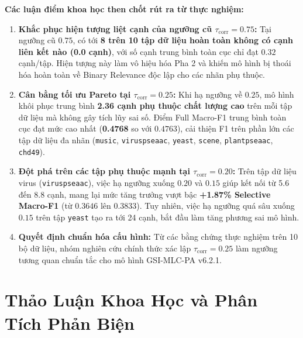 \documentclass[10pt,a4paper,twoside]{article}
\begin{document}
\noindent\textbf{Các luận điểm khoa học then chốt rút ra từ thực nghiệm:}
\begin{enumerate}[leftmargin=*]
    \item \textbf{Khắc phục hiện tượng liệt cạnh của ngưỡng cũ $\tau_{\text{corr}} = 0.75$:} 
    Tại ngưỡng cũ $0.75$, có tới \textbf{8 trên 10 tập dữ liệu hoàn toàn không có cạnh liên kết nào (0.0 cạnh)}, với số cạnh trung bình toàn cục chỉ đạt $0.32$ cạnh/tập. Hiện tượng này làm vô hiệu hóa Pha 2 và khiến mô hình bị thoái hóa hoàn toàn về Binary Relevance độc lập cho các nhãn phụ thuộc.
    \item \textbf{Cân bằng tối ưu Pareto tại $\tau_{\text{corr}} = 0.25$:} 
    Khi hạ ngưỡng về $0.25$, mô hình khôi phục trung bình \textbf{2.36 cạnh phụ thuộc chất lượng cao} trên mỗi tập dữ liệu mà không gây tích lũy sai số. Điểm Full Macro-F1 trung bình toàn cục đạt mức cao nhất (\textbf{0.4768} so với $0.4763$), cải thiện F1 trên phần lớn các tập dữ liệu đa nhãn (\texttt{music}, \texttt{viruspseaac}, \texttt{yeast}, \texttt{scene}, \texttt{plantpseaac}, \texttt{chd49}).
    \item \textbf{Đột phá trên các tập phụ thuộc mạnh tại $\tau_{\text{corr}} = 0.20$:} 
    Trên tập dữ liệu virus (\texttt{viruspseaac}), việc hạ ngưỡng xuống $0.20$ và $0.15$ giúp kết nối từ 5.6 đến 8.8 cạnh, mang lại mức tăng trưởng vượt bậc \textbf{+1.87\% Selective Macro-F1} (từ $0.3646$ lên $0.3833$). Tuy nhiên, việc hạ ngưỡng quá sâu xuống $0.15$ trên tập \texttt{yeast} tạo ra tới 24 cạnh, bắt đầu làm tăng phương sai mô hình.
    \item \textbf{Quyết định chuẩn hóa cấu hình:}
    Từ các bằng chứng thực nghiệm trên 10 bộ dữ liệu, nhóm nghiên cứu chính thức xác lập \textbf{$\tau_{\text{corr}} = 0.25$} làm ngưỡng tương quan chuẩn tắc cho mô hình GSI-MLC-PA v6.2.1.
\end{enumerate}

\section{Thảo Luận Khoa Học và Phân Tích Phản Biện}
\end{document}
